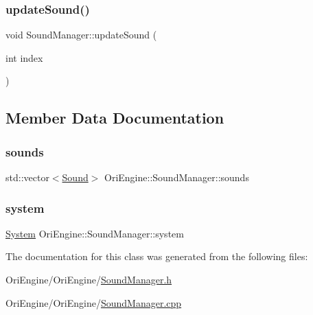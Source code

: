 \hypertarget{class_ori_engine_1_1_sound_manager_a5da083b0b4feb1ae9c3c86823d5be196}{}\label{class_ori_engine_1_1_sound_manager_a5da083b0b4feb1ae9c3c86823d5be196} 
\subsubsection{\texorpdfstring{update\+Sound()}{updateSound()}}
{\footnotesize\ttfamily void Sound\+Manager\+::update\+Sound (\begin{DoxyParamCaption}\item[{int}]{index }\end{DoxyParamCaption})}



\subsection{Member Data Documentation}
\hypertarget{class_ori_engine_1_1_sound_manager_a241dbad02456e387d20aa32694d8c5eb}{}\label{class_ori_engine_1_1_sound_manager_a241dbad02456e387d20aa32694d8c5eb} 
\subsubsection{\texorpdfstring{sounds}{sounds}}
{\footnotesize\ttfamily std\+::vector$<$\hyperlink{class_ori_engine_1_1_sound}{Sound}$>$ Ori\+Engine\+::\+Sound\+Manager\+::sounds}

\hypertarget{class_ori_engine_1_1_sound_manager_a0530694c6def60abba7c82da657b5398}{}\label{class_ori_engine_1_1_sound_manager_a0530694c6def60abba7c82da657b5398} 
\subsubsection{\texorpdfstring{system}{system}}
{\footnotesize\ttfamily \hyperlink{class_ori_engine_1_1_system}{System} Ori\+Engine\+::\+Sound\+Manager\+::system}



The documentation for this class was generated from the following files\+:\begin{DoxyCompactItemize}
\item 
Ori\+Engine/\+Ori\+Engine/\hyperlink{_sound_manager_8h}{Sound\+Manager.\+h}\item 
Ori\+Engine/\+Ori\+Engine/\hyperlink{_sound_manager_8cpp}{Sound\+Manager.\+cpp}\end{DoxyCompactItemize}
